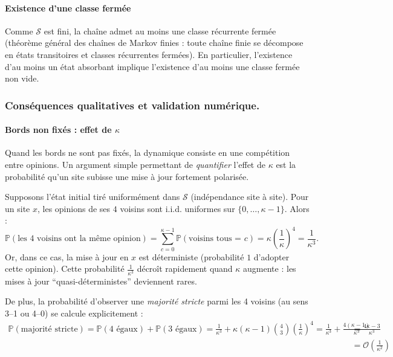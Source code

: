 \documentclass[11pt,a4paper]{article}
\begin{document}
\paragraph{Existence d’une classe fermée}
Comme $\mathcal{S}$ est fini, la chaîne admet au moins une classe récurrente fermée
(théorème général des chaînes de Markov finies : toute chaîne finie se décompose en états transitoires
et classes récurrentes fermées). En particulier, l’existence d’au moins un état absorbant implique
l’existence d’au moins une classe fermée non vide.

\subsubsection{Conséquences qualitatives et validation numérique.\\}

\paragraph{Bords non fixés : effet de $\kappa$}

Quand les bords ne sont pas fixés, la dynamique consiste en une compétition entre opinions.
Un argument simple permettant de \emph{quantifier} l’effet de $\kappa$ est la probabilité qu’un site
subisse une mise à jour fortement polarisée.

Supposons l’état initial tiré uniformément dans $\mathcal{S}$ (indépendance site à site).
Pour un site $x$, les opinions de ses $4$ voisins sont i.i.d. uniformes sur $\{0,\dots,\kappa-1\}$.
Alors :
\[
\mathbb{P}(\text{les 4 voisins ont la même opinion})
=\sum_{c=0}^{\kappa-1}\mathbb{P}(\text{voisins tous = }c)
=\kappa\left(\frac{1}{\kappa}\right)^4=\frac{1}{\kappa^3}.
\]
Or, dans ce cas, la mise à jour en $x$ est déterministe (probabilité $1$ d’adopter cette opinion).
Cette probabilité $\frac{1}{\kappa^3}$ décroît rapidement quand $\kappa$ augmente : les mises à jour
``quasi-déterministes'' deviennent rares.

De plus, la probabilité d’observer une \emph{majorité stricte} parmi les 4 voisins (au sens 3--1 ou 4--0)
se calcule explicitement :
\begin{equation*}
  \begin{split}
\mathbb{P}(\text{majorité stricte})
=\mathbb{P}(4\text{ égaux})+\mathbb{P}(3\text{ égaux})
=\frac{1}{\kappa^3}+\kappa(\kappa-1)\binom{4}{3}\left(\frac{1}{\kappa}\right)^4
=\frac{1}{\kappa^3}+\frac{4(\kappa-1)}{\kappa^3}
&=\frac{4\kappa-3}{\kappa^3} \\
&= \mathcal{O}(\frac{1}{\kappa^2})
  \end{split}
\end{equation*}
\end{document}
